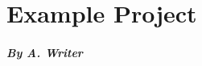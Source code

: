 \pagestyle{empty}

\section{Example Project}\label{example-project}

\subparagraph{By A. Writer}\label{by-a.-writer}

\pagebreak
\pagestyle{plain}
